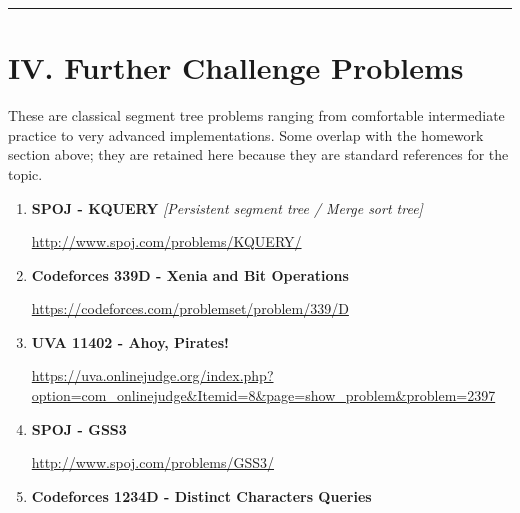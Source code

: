 \documentclass[11pt]{article}
\begin{document}
\vspace{1em}
\hrule
\vspace{1em}

\section*{IV. Further Challenge Problems}

These are classical segment tree problems ranging from comfortable intermediate
practice to very advanced implementations.
Some overlap with the homework section above; they are retained here because
they are standard references for the topic.

\begin{enumerate}

    \item \textbf{SPOJ - KQUERY}
    \hfill \textit{[Persistent segment tree / Merge sort tree]}

    \vspace{0.3em}
    {\small\url{http://www.spoj.com/problems/KQUERY/}}

    \vspace{0.8em}

    \item \textbf{Codeforces 339D - Xenia and Bit Operations}

    \vspace{0.3em}
    {\small\url{https://codeforces.com/problemset/problem/339/D}}

    \vspace{0.8em}

    \item \textbf{UVA 11402 - Ahoy, Pirates!}

    \vspace{0.3em}
    {\small\url{https://uva.onlinejudge.org/index.php?option=com_onlinejudge&Itemid=8&page=show_problem&problem=2397}}

    \vspace{0.8em}

    \item \textbf{SPOJ - GSS3}

    \vspace{0.3em}
    {\small\url{http://www.spoj.com/problems/GSS3/}}

    \vspace{0.8em}

    \item \textbf{Codeforces 1234D - Distinct Characters Queries}


\end{enumerate}
\end{document}
